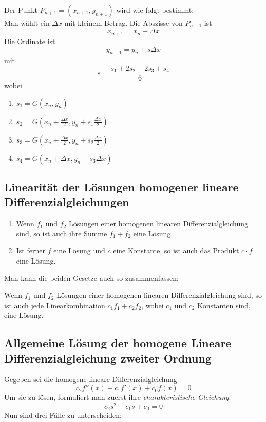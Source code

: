 \documentclass[10pt,a4paper]{scrartcl}
\begin{document}
Der Punkt $P_{n+1} = (x_{n+1},y_{n+1})$ wird wie folgt bestimmt:\\
Man wählt ein $\Delta{x}$ mit kleinem Betrag. Die Abszisse von $P_{n+1}$ ist
$$x_{n+1} = x_n + \Delta x$$
Die Ordinate ist
$$y_{n+1} = y_n + s\Delta x$$
mit
$$s = \frac{s_1 + 2s_2 + 2s_3 + s_4}{6}$$
wobei
\begin{enumerate}
    \item $\displaystyle s_1 = G(x_n, y_n)$
    \item $\displaystyle s_2 = G\left(x_n + \frac{\Delta{x}}{2}, y_n + s_1
        \frac{\Delta x}{2}\right)$
    \item $\displaystyle s_3 = G\left(x_n + \frac{\Delta{x}}{2}, y_n + s_2
        \frac{\Delta x}{2}\right)$
    \item $\displaystyle s_4 = G(x_n+\Delta x, y_n+s_3\Delta x)$
\end{enumerate}


\subsection{Linearität der Lösungen homogener lineare Differenzialgleichungen}

\begin{enumerate}
    \item Wenn $f_1$ und $f_2$ Lösungen einer homogenen linearen
        Differenzialgleichung sind, so ist auch ihre Summe $f_1 + f_2$ eine
        Lösung.
    \item Ist ferner $f$ eine Lösung und $c$ eine Konstante, so ist auch das
        Produkt $c \cdot f$ eine Lösung.
\end{enumerate}

Man kann die beiden Gesetze auch so zusammenfassen:

Wenn $f_1$ und $f_2$ Lösungen einer homogenen linearen Differenzialgleichung
sind, so ist auch jede Linearkombination $c_1f_1 + c_2f_2$, wobei $c_1$ und
$c_2$ Konstanten sind, eine Lösung.


\subsection{Allgemeine Lösung der homogene Lineare Differenzialgleichung
    zweiter Ordnung}

Gegeben sei die homogene lineare Differenzialgleichung
$$c_2f''(x) + c_1f'(x) + c_0f(x) = 0$$
Um sie zu lösen, formuliert man zuerst ihre \emph{charakteristische Gleichung}.
$$c_2s^2 + c_1s + c_0 = 0$$
Nun sind drei Fälle zu unterscheiden:
\end{document}
